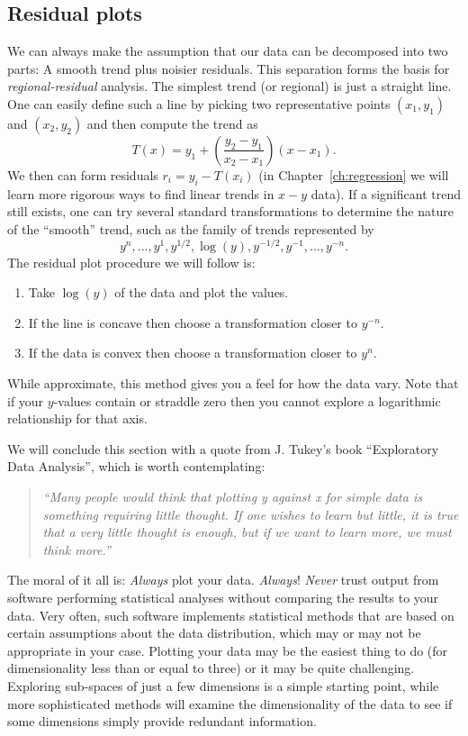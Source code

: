 \subsection{Residual plots}
	We can always make the assumption that our data can be decomposed into two parts: A 
smooth trend plus noisier residuals.  This separation forms the basis for \emph{regional-residual} analysis.
The simplest trend (or regional) is just a straight line.  One can easily define such 
a line by picking two representative points $(x_1,y_1)$ and $(x_2,y_2)$ and then compute the trend as
\begin{equation}
T(x) = y_1 + \left ( \frac{y_2 - y_1}{x_2 - x_1}\right ) (x - x_1).
\end{equation}
We then can form residuals $r_i = y_i - T(x_i)$ (in Chapter~\ref{ch:regression} we will learn more rigorous ways to find 
linear trends in $x-y$ data).  If a significant trend still exists, one can try several standard 
transformations to determine the nature of the ``smooth'' trend, such as the family of trends represented by
\begin{equation}
y^n,..., y^1, y^{1/2}, \log(y), y^{-1/2}, y^{-1},..., y^{-n}.
\end{equation}
The residual plot procedure we will follow is:
\begin{enumerate}
	\item Take $\log (y)$ of the data and plot the values.
	\item If the line is concave then choose a transformation closer to $y^{-n}$.
	\item If the data is convex then choose a  transformation closer to $y^n$.
\end{enumerate}
While approximate, this method gives you a feel for how the data 
vary.  Note that if your $y$-values contain or straddle zero then you cannot explore a logarithmic relationship for that axis.

	We will conclude this section with a quote from J. Tukey's book ``Exploratory Data Analysis'',
which is worth contemplating: 

\begin{quote}
\emph{``Many people would think that plotting y against x for simple data is something 
requiring little thought.  If one wishes to learn but little, it is true that a very little 
thought is enough, but if we want to learn more, we must think more.''}
\end{quote}

The moral of it all is:  \emph{Always} plot your data.  \emph{Always}! \emph{Never} trust output from software performing statistical 
analyses without comparing the results to your data.  Very often, such software implements statistical
methods that are based on certain
assumptions about the data distribution, which may or may not be appropriate in your case.  Plotting your
data may be the easiest thing to do (for dimensionality less than or equal to three) or it may be quite
challenging.  Exploring sub-spaces of just a few dimensions is a simple starting point, while more
sophisticated methods will examine the dimensionality of the data to see if some dimensions simply
provide redundant information.

